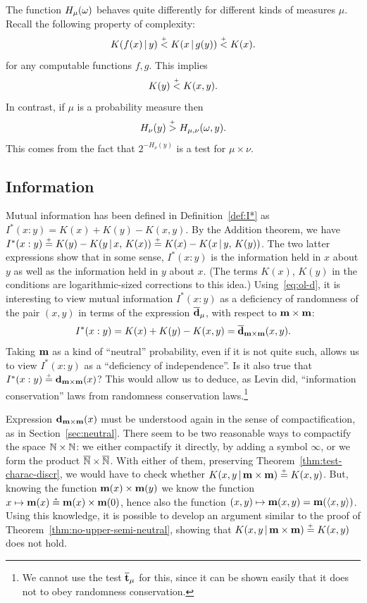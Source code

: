   The function $H_\mu(\omega)$ behaves quite differently for different
kinds of measures $\mu$.
Recall the following property of complexity:
 \begin{equation} \label{eq:compl.of.fun}
  K(f(x)\,\vert\, y)\stackrel{{}_+}{<} K(x\,\vert\, g(y)) \stackrel{{}_+}{<} K(x) .
 \end{equation}
for any computable functions $f,g$.
This implies
 \[
   K(y)\stackrel{{}_+}{<} K(x,y).
 \]
  In contrast, if $\mu$ is a probability measure then
 \[
    H_\nu(y) \stackrel{{}_+}{>} H_{\mu,\nu}(\omega,y).
 \]
  This comes from the fact that $2^{-H_\nu(y)}$ is a test for
$\mu\times\nu$.

\subsection{Information}

Mutual information has been defined in Definition~\ref{def:I*}
as $I^{*}(x : y) = K(x) + K(y) - K(x,y)$.
By the Addition theorem, we have
$I^{*}(x:y) \stackrel{{}_+}{=} K(y) - K(y \,\vert\, x,\, K(x)) \stackrel{{}_+}{=} K(x) - K(x \,\vert\, y,\,K(y))$.   
The two latter expressions show that in some sense, $I^{*}(x:y)$ is the
information held in $x$ about $y$ as well as the information held in $y$
about $x$.  
(The terms $K(x)$, $K(y)$ in the conditions are
logarithmic-sized corrections to this idea.)
Using~\eqref{eq:ol-d}, it is interesting to view
mutual information $I^{*}(x : y)$ as a deficiency of randomness of
the pair $(x,y)$
in terms of the expression $\overline{\mathbf{d}}_{\mu}$, with respect to $\mathbf{m} \times \mathbf{m}$:
 \[
   I^{*}(x : y) = K(x) + K(y) - K(x,y) = \overline{\mathbf{d}}_{\mathbf{m} \times \mathbf{m}}(x, y).
 \]
Taking $\mathbf{m}$ as a kind of ``neutral'' probability, even if it is not quite
such, allows us to view $I^{*}(x:y)$ as a ``deficiency of independence''.
Is it also true that $I^{*}(x:y) \stackrel{{}_+}{=} \mathbf{d}_{\mathbf{m} \times \mathbf{m}}(x)$?
This would allow us to deduce, as Levin did, ``information conservation''
laws from randomness conservation laws.\footnote{We cannot use the 
test $\overline{\mathbf{t}}_{\mu}$ for this, since it can be shown easily
that it does not to obey randomness conservation.}

Expression $\mathbf{d}_{\mathbf{m} \times \mathbf{m}}(x)$ must be understood
again in the sense of compactification, as in
Section~\ref{sec:neutral}.
There seem to be two reasonable ways to compactify the space
$\mathbb{N}\times\mathbb{N}$: we either compactify it directly, by adding a symbol
$\infty$, or we form the product $\overline{\mathbb{N}} \times \overline{\mathbb{N}}$.
With either of them, preserving
Theorem~\ref{thm:test-charac-discr}, we would
have to check whether $K(x,y \,\vert\, \mathbf{m} \times \mathbf{m}) \stackrel{{}_+}{=} K(x,y)$.
But, knowing the function $\mathbf{m}(x)\times\mathbf{m}(y)$ we 
know the function $x \mapsto \mathbf{m}(x) \stackrel{{}_*}{=} \mathbf{m}(x) \times \mathbf{m}(0)$,
hence also the function $(x,y)\mapsto\mathbf{m}(x,y) = \mathbf{m}({\mathopen\langle x,y\mathclose\rangle})$.
Using this knowledge, it is possible to develop an argument similar to
the proof of Theorem~\ref{thm:no-upper-semi-neutral}, showing that
$K(x,y \,\vert\, \mathbf{m} \times \mathbf{m}) \stackrel{{}_+}{=} K(x,y)$ does not hold.


